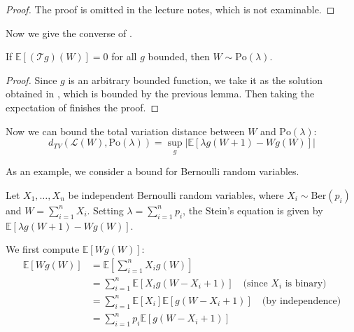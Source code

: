 \documentclass{article}
\begin{document}
\begin{proof}
    The proof is omitted in the lecture notes, which is not examinable. 
\end{proof}

Now we give the converse of .

\begin{proposition}\label{prop: direction2 poisson}
    If $\mathbb{E}[(\mathcal{T}g)(W)]=0$ for all $g$ bounded, then $W\sim \text{Po}(\lambda)$.
\end{proposition}

\begin{proof}
    Since $g$ is an arbitrary bounded function, we take it as the solution obtained in , which is bounded by the previous lemma. Then taking the expectation of  finishes the proof.
\end{proof}

Now we can bound the total variation distance between $W$ and $\text{Po}(\lambda)$:
\begin{equation}\label{eq:poisson_stein_total_variation}
    d_{TV}(\mathcal{L}(W), \text{Po}(\lambda)) = \sup_{g} |\mathbb{E}[\lambda g(W+1) - Wg(W)]|
\end{equation}

As an example, we consider a bound for Bernoulli random variables. 


    Let $X_1, \ldots, X_n$ be independent Bernoulli random variables, where $X_i \sim \text{Ber}(p_i)$ and $W = \sum_{i=1}^n X_i$. Setting $\lambda = \sum_{i=1}^n p_i$, the Stein's equation is given by $\mathbb{E}[\lambda g(W+1) - Wg(W)]$.    

    We first compute $\mathbb{E}[Wg(W)]$:
    \begin{align*}
        \mathbb{E}[Wg(W)] &= \mathbb{E}[\sum_{i=1}^n X_i g(W)]\\
        &= \sum_{i=1}^n \mathbb{E}[X_i g(W - X_i + 1)] \quad \text{(since $X_i$ is binary)}
        \\
        &= \sum_{i=1}^n \mathbb{E}[X_i] \mathbb{E}[g(W - X_i + 1)] \quad \text{(by independence)}\\
        &= \sum_{i=1}^n p_i \mathbb{E}[g(W - X_i + 1)]
    \end{align*}
\end{document}
